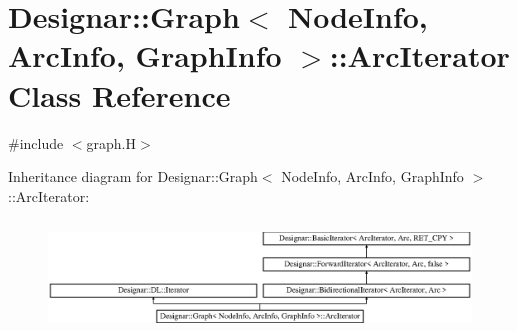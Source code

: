 \hypertarget{class_designar_1_1_graph_1_1_arc_iterator}{}\section{Designar\+:\+:Graph$<$ Node\+Info, Arc\+Info, Graph\+Info $>$\+:\+:Arc\+Iterator Class Reference}
\label{class_designar_1_1_graph_1_1_arc_iterator}


{\ttfamily \#include $<$graph.\+H$>$}

Inheritance diagram for Designar\+:\+:Graph$<$ Node\+Info, Arc\+Info, Graph\+Info $>$\+:\+:Arc\+Iterator\+:\begin{figure}[H]
\begin{center}
\leavevmode
\includegraphics[height=3.027027cm]{class_designar_1_1_graph_1_1_arc_iterator}
\end{center}
\end{figure}
